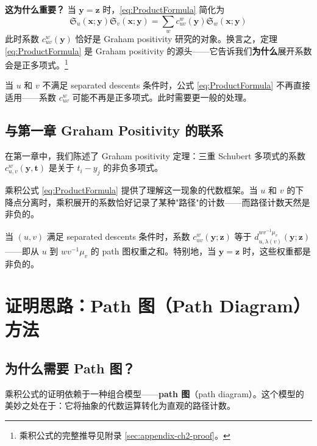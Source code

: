 \textbf{这为什么重要？} 当 $\mathbf{y} = \mathbf{z}$ 时，\eqref{eq:ProductFormula} 简化为
\begin{equation}
\mathfrak{S}_u(\mathbf{x}; \mathbf{y}) \mathfrak{S}_v(\mathbf{x}; \mathbf{y}) = \sum_w c^w_{uv}(\mathbf{y}) \mathfrak{S}_w(\mathbf{x}; \mathbf{y})
\label{eq:YGequalsZ}
\end{equation}
此时系数 $c^w_{uv}(\mathbf{y})$ 恰好是 Graham positivity 研究的对象。换言之，定理 \cref{eq:ProductFormula} 是 Graham positivity 的源头——它告诉我们\textbf{为什么}展开系数会是正多项式。\footnote{乘积公式的完整推导见附录 \cref{sec:appendix-ch2-proof}。}

\begin{Remark}
当 $u$ 和 $v$ 不满足 separated descents 条件时，公式 \eqref{eq:ProductFormula} 不再直接适用——系数 $c_{uv}^w$ 可能不再是正多项式。此时需要更一般的处理。
\end{Remark}

\subsection{与第一章 Graham Positivity 的联系}

在第一章中，我们陈述了 Graham positivity 定理：三重 Schubert 多项式的系数 $c_{u,v}^w(\mathbf{y},\mathbf{t})$ 是关于 $t_i - y_j$ 的非负多项式。

乘积公式 \eqref{eq:ProductFormula} 提供了理解这一现象的代数框架。当 $u$ 和 $v$ 的下降点分离时，乘积展开的系数恰好记录了某种"路径"的计数——而路径计数天然是非负的。

\begin{Corollary}
当 $(u, v)$ 满足 separated descents 条件时，系数 $c_{uv}^w(\mathbf{y}; \mathbf{z})$ 等于 $d_{u,\lambda(v)}^{w v^{-1}\mu_v}(\mathbf{y}; \mathbf{z})$——即从 $u$ 到 $w v^{-1}\mu_v$ 的 path 图权重之和。特别地，当 $\mathbf{y} = \mathbf{z}$ 时，这些权重都是非负的。
\end{Corollary}

\section{证明思路：Path 图（Path Diagram）方法}
\label{sec:PathDiagram}

\subsection{为什么需要 Path 图？}

乘积公式的证明依赖于一种组合模型——\textbf{path 图}（path diagram）。这个模型的美妙之处在于：它将抽象的代数运算转化为直观的路径计数。

